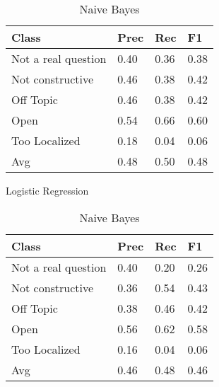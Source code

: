 \begin{table}[!htpb]
\centering
\begin{minipage}{.5\linewidth}
    \begin{tabular}{|l|l|l|l|} \hline
    \textbf{Class}& \textbf{Prec} & \textbf{Rec} & \textbf{F1} \\ \hline
    Not a real question & 0.40      & 0.36   & 0.38     \\
    Not constructive    & 0.46      & 0.38   & 0.42     \\
    Off Topic           & 0.46      & 0.38   & 0.42     \\
    Open                & 0.54      & 0.66   & 0.60     \\
    Too Localized       & 0.18      & 0.04   & 0.06     \\ \hline
    Avg                 & 0.48      & 0.50   & 0.48   \\ \hline  
    \end{tabular}
    \caption{Logistic Regression}
    \label{tab:lr}
\end{minipage}%
\begin{minipage}{.5\linewidth}
    \begin{tabular}{|l|l|l|l|} \hline
    \textbf{Class}& \textbf{Prec} & \textbf{Rec} & \textbf{F1} \\ \hline
    Not a real question & 0.40      & 0.20   & 0.26     \\
    Not constructive    & 0.36      & 0.54   & 0.43     \\
    Off Topic           & 0.38      & 0.46   & 0.42     \\
    Open                & 0.56      & 0.62   & 0.58     \\
    Too Localized       & 0.16      & 0.04   & 0.06     \\ \hline
    Avg                 & 0.46      & 0.48   & 0.46   \\ \hline  
    \end{tabular}
    \caption{Naive Bayes}
    \label{tab:nb}
\end{minipage}
\end{table}


